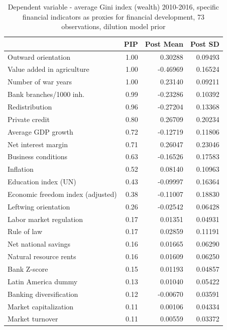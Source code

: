 \begin{refsection}
\begin{subappendices}
    \begin{table}[!ht]
    \footnotesize
    \centering
    \caption{Dependent variable - average Gini index (wealth) 2010-2016, specific financial indicators as proxies for financial development, 73 observations, dilution model prior}
    \label{ch3table:res5}
    \begin{tabular}{lrrr}
      \toprule
     & \ac{PIP} & Post Mean & Post SD \\ 
      \midrule
      Outward orientation & 1.00 & 0.30288 & 0.09493 \\ 
      Value added in agriculture & 1.00 & -0.46969 & 0.16524 \\ 
      Number of war years & 1.00 & 0.23140 & 0.09211 \\ 
      Bank branches/1000 inh. & 0.99 & -0.23286 & 0.10392 \\ 
      Redistribution & 0.96 & -0.27204 & 0.13368 \\ 
      Private credit & 0.80 & 0.26709 & 0.20234 \\ 
      Average GDP growth & 0.72 & -0.12719 & 0.11806 \\ 
      Net interest margin & 0.71 & 0.26047 & 0.23046 \\ 
      Business conditions & 0.63 & -0.16526 & 0.17583 \\ 
      Inflation & 0.52 & 0.08140 & 0.10963 \\ 
      Education index (UN) & 0.43 & -0.09997 & 0.16364 \\ 
      Economic freedom index (adjusted) & 0.38 & -0.11007 & 0.18830 \\ 
      Leftwing orientation & 0.26 & -0.02542 & 0.06428 \\ 
      Labor market regulation & 0.17 & 0.01351 & 0.04931 \\ 
      Rule of law & 0.17 & 0.02859 & 0.11191 \\ 
      Net national savings & 0.16 & 0.01665 & 0.06290 \\ 
      Natural resource rents & 0.16 & 0.01609 & 0.06250 \\ 
      Bank Z-score & 0.15 & 0.01193 & 0.04857 \\ 
      Latin America dummy & 0.13 & 0.01040 & 0.05422 \\ 
      Banking diversification & 0.12 & -0.00670 & 0.03591 \\ 
      Market capitalization & 0.11 & 0.00106 & 0.04334 \\ 
      Market turnover & 0.11 & 0.00559 & 0.03372 \\ 

\end{tabular}
\end{table}
\end{subappendices}
\end{refsection}
